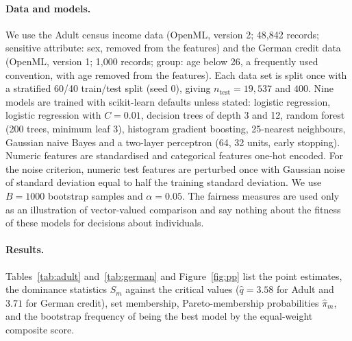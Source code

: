 \documentclass[pdflatex,sn-mathphys-num,iicol]{sn-jnl}
\theoremstyle{thmstyleone}
\theoremstyle{thmstyletwo}
\begin{document}
\paragraph{Data and models.} We use the Adult census income data (OpenML, version 2; 48,842 records; sensitive attribute: sex, removed from the features) and the German credit data (OpenML, version 1; 1,000 records; group: age below 26, a frequently used convention, with age removed from the features). Each data set is split once with a stratified 60/40 train/test split (seed 0), giving $n_{\text{test}}=19{,}537$ and $400$. Nine models are trained with scikit-learn defaults unless stated: logistic regression, logistic regression with $C=0.01$, decision trees of depth 3 and 12, random forest (200 trees, minimum leaf 3), histogram gradient boosting, 25-nearest neighbours, Gaussian naive Bayes and a two-layer perceptron (64, 32 units, early stopping). Numeric features are standardised and categorical features one-hot encoded. For the noise criterion, numeric test features are perturbed once with Gaussian noise of standard deviation equal to half the training standard deviation. We use $B=1000$ bootstrap samples and $\alpha=0.05$. The fairness measures are used only as an illustration of vector-valued comparison and say nothing about the fitness of these models for decisions about individuals.

\paragraph{Results.} Tables~\ref{tab:adult} and~\ref{tab:german} and Figure~\ref{fig:pp} list the point estimates, the dominance statistics $S_m$ against the critical values ($\hat q=3.58$ for Adult and $3.71$ for German credit), set membership, Pareto-membership probabilities $\hat\pi_m$, and the bootstrap frequency of being the best model by the equal-weight composite score.
\end{document}
